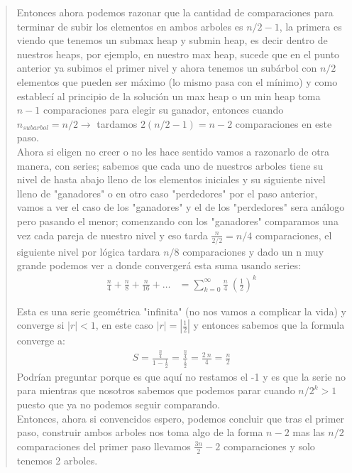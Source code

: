 \begin{quote}
    Entonces ahora podemos razonar que la cantidad de comparaciones para terminar de subir los elementos en ambos arboles es $n/2 - 1$, la primera es viendo que tenemos un submax heap y submin heap, es decir dentro de nuestros heaps, por ejemplo, en nuestro max heap, sucede que en el punto anterior ya subimos el primer nivel y ahora tenemos un subárbol con $n/2$ elementos que pueden ser máximo (lo mismo pasa con el mínimo) y como establecí al principio de la solución un max heap o un min heap toma $n-1$ comparaciones para elegir su ganador, entonces cuando $n_{subarbol}=n/2 \xrightarrow{}$ tardamos $2(n/2-1)=n-2$ comparaciones en este paso.\\
    Ahora si eligen no creer o no les hace sentido vamos a razonarlo de otra manera, con series; sabemos que cada uno de nuestros arboles tiene su nivel de hasta abajo lleno de los elementos iniciales y su siguiente nivel lleno de "ganadores" o en otro caso "perdedores" por el paso anterior, vamos a ver el caso de los "ganadores" y el de los "perdedores" sera análogo pero pasando el menor; comenzando con los "ganadores" comparamos una vez cada pareja de nuestro nivel y eso tarda $\frac{n}{2/2} = n/4$ comparaciones, el siguiente nivel por lógica tardara $n/8$ comparaciones y dado un n muy grande podemos ver a donde convergerá esta suma usando series:
    \begin{align*}
        \frac{n}{4} + \frac{n}{8} + \frac{n}{16} + \dots &= \sum_{k=0}^{\infty} \frac{n}{4} \ \left(\frac{1}{2}\right)^k
    \end{align*}

    Esta es una serie geométrica "infinita" (no nos vamos a complicar la vida) y converge si $|r|<1$, en este caso $|r|=|\frac{1}{2}|$ y entonces sabemos que la formula converge a:
    \begin{align*}
        S = \frac{\frac{n}{4}}{1-\frac{1}{2}} = \frac{\frac{n}{4}}{\frac{1}{2}} = \frac{2 \ n}{4} = \frac{n}{2}
    \end{align*}
    Podrían preguntar porque es que aquí no restamos el -1 y es que la serie no para mientras que nosotros sabemos que podemos parar cuando $n/2^k > 1$ puesto que ya no podemos seguir comparando.\\

    Entonces, ahora si convencidos espero, podemos concluir que tras el primer paso, construir ambos arboles nos toma algo de la forma $n-2$ mas las $n/2$ comparaciones del primer paso llevamos $\frac{3n}{2}-2$ comparaciones y solo tenemos 2 arboles.\\


\end{quote}
